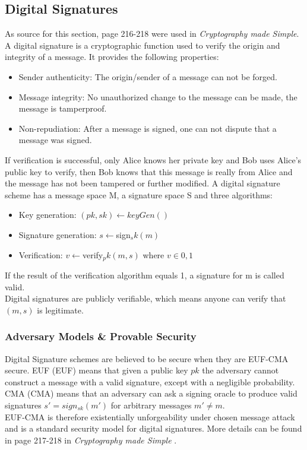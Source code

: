 \subsection{Digital Signatures}
\label{sec:sign-schemes}
As source for this section, page 216-218 were used in \textit{Cryptography made Simple}\cite{modernCrypto}.
A digital signature is a cryptographic function used to verify the origin and integrity of a message.
It provides the following properties:
\begin{itemize}
    \item Sender authenticity: The origin/sender of a message can not be forged.
    \item Message integrity: No unauthorized change to the message can be made, the message is tamperproof.
    \item Non-repudiation: After a message is signed, one can not dispute that a message was signed.
\end{itemize}
If verification is successful, only Alice knows her private key and Bob uses Alice's public key to verify, then Bob knows that this message is really from Alice and the message has not been tampered or further modified.
A digital signature scheme has a message space M, a signature space S and three algorithms:
\begin{itemize}
    \item Key generation: $(pk,sk) \gets keyGen()$
    \item Signature generation: $s \gets $sign$_sk(m)$
    \item Verification: $ v \gets $verify$_pk(m,s)$ where $v \in {0,1}$
\end{itemize}
If the result of the verification algorithm equals 1, a signature for m is called valid.
\\Digital signatures are publicly verifiable, which means anyone can verify that $(m,s)$ is legitimate.

\subsubsection{Adversary Models \& Provable Security}
\label{sec:euf-cma}
Digital Signature schemes are believed to be secure when they are EUF-CMA secure.
\acl{EUF} (\ac{EUF}) means that given a public key $pk$ the adversary cannot construct a message with a valid signature, except with a negligible probability.
\acl{CMA} (\ac{CMA}) means that an adversary can ask a signing oracle to produce valid signatures $s' = sign_{sk}(m')$ for arbitrary messages $m' \ne m$.\\
EUF-CMA is therefore existentially unforgeability under chosen message attack and is a standard security model for digital signatures.
More details can be found in page 217-218 in \textit{Cryptography made Simple} \cite{modernCrypto}.


